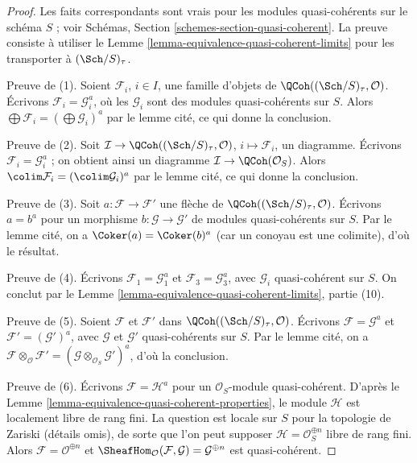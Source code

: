 \begin{proof}
Les faits correspondants sont vrais pour les modules quasi-cohérents sur le
schéma $S$ ; voir Schémas, Section
\ref{schemes-section-quasi-coherent}. La preuve consiste à utiliser le
Lemme \ref{lemma-equivalence-quasi-coherent-limits} pour les transporter à
$(\Sch/S)_\tau$.

\medskip\noindent
Preuve de (1). Soient $\mathcal{F}_i$, $i \in I$, une famille d'objets de
$\QCoh((\Sch/S)_\tau, \mathcal{O})$. Écrivons
$\mathcal{F}_i = \mathcal{G}_i^a$, où les $\mathcal{G}_i$ sont des modules
quasi-cohérents sur $S$. Alors
$\bigoplus \mathcal{F}_i = (\bigoplus \mathcal{G}_i)^a$ par le lemme cité,
ce qui donne la conclusion.

\medskip\noindent
Preuve de (2). Soit
$\mathcal{I} \to \QCoh((\Sch/S)_\tau, \mathcal{O})$,
$i \mapsto \mathcal{F}_i$, un diagramme. Écrivons
$\mathcal{F}_i = \mathcal{G}_i^a$ ; on obtient ainsi un diagramme
$\mathcal{I} \to \QCoh(\mathcal{O}_S)$. Alors
$\colim \mathcal{F}_i = (\colim \mathcal{G}_i)^a$ par le lemme cité,
ce qui donne la conclusion.

\medskip\noindent
Preuve de (3). Soit $a : \mathcal{F} \to \mathcal{F}'$ une flèche de
$\QCoh((\Sch/S)_\tau, \mathcal{O})$. Écrivons $a = b^a$ pour un morphisme
$b : \mathcal{G} \to \mathcal{G}'$ de modules quasi-cohérents sur $S$.
Par le lemme cité, on a $\Coker(a) = \Coker(b)^a$ (car un conoyau est une
colimite), d'où le résultat.

\medskip\noindent
Preuve de (4). Écrivons $\mathcal{F}_1 = \mathcal{G}_1^a$ et
$\mathcal{F}_3 = \mathcal{G}_3^a$, avec $\mathcal{G}_i$ quasi-cohérent sur
$S$. On conclut par le Lemme
\ref{lemma-equivalence-quasi-coherent-limits}, partie (10).

\medskip\noindent
Preuve de (5). Soient $\mathcal{F}$ et $\mathcal{F}'$ dans
$\QCoh((\Sch/S)_\tau, \mathcal{O})$. Écrivons
$\mathcal{F} = \mathcal{G}^a$ et
$\mathcal{F}' = (\mathcal{G}')^a$, avec $\mathcal{G}$ et $\mathcal{G}'$
quasi-cohérents sur $S$. Par le lemme cité, on a
$\mathcal{F} \otimes_\mathcal{O} \mathcal{F}' =
(\mathcal{G} \otimes_{\mathcal{O}_S} \mathcal{G}')^a$,
d'où la conclusion.

\medskip\noindent
Preuve de (6). Écrivons $\mathcal{F} = \mathcal{H}^a$ pour un
$\mathcal{O}_S$-module quasi-cohérent. D'après le
Lemme \ref{lemma-equivalence-quasi-coherent-properties}, le module
$\mathcal{H}$ est localement libre de rang fini. La question est locale sur
$S$ pour la topologie de Zariski (détails omis), de sorte que l'on peut
supposer $\mathcal{H} = \mathcal{O}_S^{\oplus n}$ libre de rang fini.
Alors $\mathcal{F} = \mathcal{O}^{\oplus n}$ et
$\SheafHom_\mathcal{O}(\mathcal{F}, \mathcal{G}) = \mathcal{G}^{\oplus n}$
est quasi-cohérent.
\end{proof}

